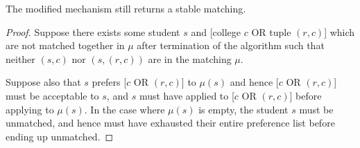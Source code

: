 \documentclass[runningheads]{llncs}
\begin{document}
\begin{theorem}
The modified mechanism still returns a stable matching.
\end{theorem}
%
%
\begin{proof}
    Suppose there exists some student $s$ and [college $c$ OR tuple $(r,c)$] which are not matched together in $\mu$ after termination of the algorithm such that neither $(s,c)$ nor $(s,(r,c))$ are in the matching $\mu$.

    Suppose also that $s$ prefers [$c$ OR $(r,c)$] to $\mu(s)$ and hence [$c$ OR $(r,c)$] must be acceptable to $s$, and $s$ must have applied to [$c$ OR $(r,c)$] before applying to $\mu(s)$. In the case where $\mu(s)$ is empty, the student $s$ must be unmatched, and hence must have exhausted their entire preference list before ending up unmatched.


\end{proof}
\end{document}

